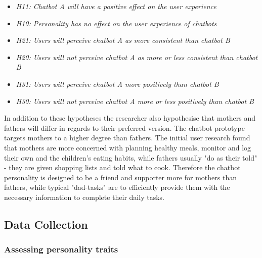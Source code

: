     \begin{itemize}
         \item \textit {H11: Chatbot A will have a positive effect on the user experience}
        \item \textit {H10: Personality has no effect on the user experience of chatbots}
            \vspace{5mm} %

        \item \textit {H21: Users will perceive chatbot A as more consistent than chatbot B}
        \item  \textit {H20: Users will not perceive chatbot A as more or less consistent than chatbot B} 
            \vspace{5mm} %

        \item \textit {H31: Users will perceive chatbot A more positively than chatbot B}
        \item \textit {H30: Users will not perceive chatbot A more or less positively than chatbot B}
    \end{itemize}
    
    In addition to these hypotheses the researcher also hypothesise that mothers and fathers will differ in regards to their preferred version. The chatbot prototype targets mothers to a higher degree than fathers. The initial user research found that mothers are more concerned with planning healthy meals, monitor and log their own and the children's eating habits, while fathers usually "do as their told" - they are given shopping lists and told what to cook. Therefore the chatbot personality is designed to be a friend and supporter more for mothers than fathers, while typical "dad-tasks" are to efficiently provide them with the necessary information to complete their daily tasks. 
    
    \vspace{5mm} %
    
    \subsection{Data Collection}
    
    \vspace{5mm} %

     \subsubsection{Assessing personality traits}
     
